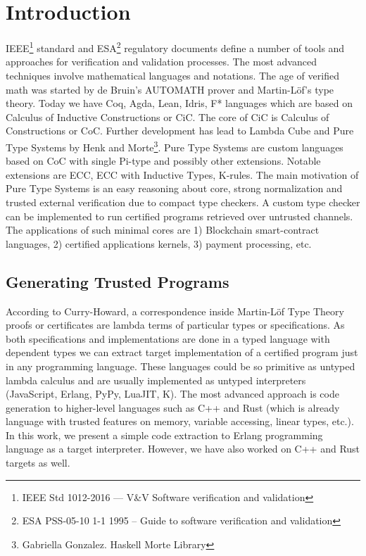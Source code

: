 \documentclass{article}
\begin{document}
\section{Introduction}
IEEE\footnote{IEEE Std 1012-2016  --- V\&V Software verification and validation} standard
and ESA\footnote{ESA PSS-05-10 1-1 1995 -- Guide to software verification and validation} regulatory documents define a number of tools and approaches for verification and validation processes. 
The most advanced techniques involve mathematical languages and notations. 
The age of verified math was started by de Bruin's AUTOMATH prover and Martin-Löf\cite{Lof84}'s type theory. 
Today we have Coq, Agda, Lean, Idris, F* languages which are based on Calculus of Inductive Constructions or CiC\cite{Mohring15}.
The core of CiC is Calculus of Constructions or CoC\cite{Coq88}.
Further development has lead to Lambda Cube\cite{Henk93} and Pure Type Systems by Henk\cite{Erik97} and Morte\footnote{Gabriella Gonzalez. Haskell Morte Library}.
Pure Type Systems are custom languages based on CoC with single Pi-type and possibly other extensions.
Notable extensions are ECC, ECC with Inductive Types\cite{Ore92}, K-rules\cite{Barthe95}.
The main motivation of Pure Type Systems is an easy reasoning about core, strong normalization and trusted external verification due to compact type checkers.
A custom type checker can be implemented to run certified programs retrieved over untrusted channels.
The applications of such minimal cores are 1) Blockchain smart-contract languages, 2) certified applications kernels, 3) payment processing, etc.

\subsection{Generating Trusted Programs}
According to Curry-Howard, a correspondence inside Martin-Löf Type Theory\cite{Lof84} proofs or certificates are lambda terms of particular types or specifications.
As both specifications and implementations are done in a typed language with dependent types we can extract target implementation of a certified program just in any programming language.
These languages could be so primitive as untyped lambda calculus and are usually implemented as untyped interpreters (JavaScript, Erlang, PyPy, LuaJIT, K).
The most advanced approach is code generation to higher-level languages such as C++ and Rust (which is already language with trusted features on memory, variable accessing, linear types, etc.).
In this work, we present a simple code extraction to Erlang programming language as a target interpreter.
However, we have also worked on C++ and Rust targets as well.
\end{document}
